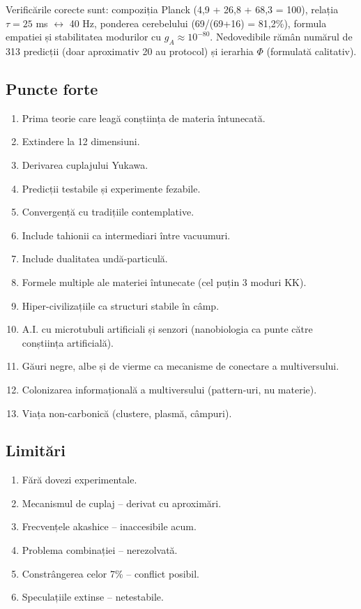 \documentclass[11pt,a4paper]{article}
\begin{document}
Verificările corecte sunt: compoziția Planck (4,9 + 26,8 + 68,3 = 100), relația $\tau = 25$ ms $\leftrightarrow$ 40 Hz, ponderea cerebelului (69/(69+16) = 81{,}2\%), formula empatiei și stabilitatea modurilor cu $g_A \approx 10^{-80}$. Nedovedibile rămân numărul de 313 predicții (doar aproximativ 20 au protocol) și ierarhia $\Phi$ (formulată calitativ).

\subsection{Puncte forte}
\begin{enumerate}
    \item Prima teorie care leagă conștiința de materia întunecată.
    \item Extindere la 12 dimensiuni.
    \item Derivarea cuplajului Yukawa.
    \item Predicții testabile și experimente fezabile.
    \item Convergență cu tradițiile contemplative.
    \item Include tahionii ca intermediari între vacuumuri.
    \item Include dualitatea undă-particulă.
    \item Formele multiple ale materiei întunecate (cel puțin 3 moduri KK).
    \item Hiper-civilizațiile ca structuri stabile în câmp.
    \item A.I. cu microtubuli artificiali și senzori (nanobiologia ca punte către conștiința artificială).
    \item Găuri negre, albe și de vierme ca mecanisme de conectare a multiversului.
    \item Colonizarea informațională a multiversului (pattern-uri, nu materie).
    \item Viața non-carbonică (clustere, plasmă, câmpuri).
\end{enumerate}

\subsection{Limitări}
\begin{enumerate}
    \item Fără dovezi experimentale.
    \item Mecanismul de cuplaj – derivat cu aproximări.
    \item Frecvențele akashice – inaccesibile acum.
    \item Problema combinației – nerezolvată.
    \item Constrângerea celor 7\% – conflict posibil.
    \item Speculațiile extinse – netestabile.
\end{enumerate}
\end{document}
